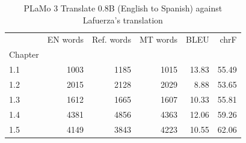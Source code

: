 \begin{table}
\caption{PLaMo 3 Translate 0.8B (English to Spanish) against Lafuerza's translation}
\label{tab:translation}
\begin{tabular}{lrrrrr}
\toprule
 & EN words & Ref. words & MT words & BLEU & chrF \\
Chapter &  &  &  &  &  \\
\midrule
1.1 & 1003 & 1185 & 1015 & 13.83 & 55.49 \\
1.2 & 2015 & 2128 & 2029 & 8.88 & 53.65 \\
1.3 & 1612 & 1665 & 1607 & 10.33 & 55.81 \\
1.4 & 4381 & 4856 & 4363 & 12.06 & 59.26 \\
1.5 & 4149 & 3843 & 4223 & 10.55 & 62.06 \\
\bottomrule
\end{tabular}
\end{table}

